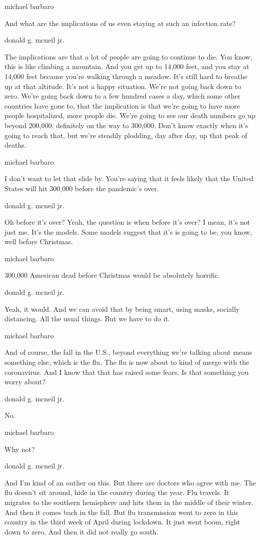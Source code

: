 michael barbaro

And what are the implications of us even staying at such an infection
rate?

donald g. mcneil jr.

The implications are that a lot of people are going to continue to die.
You know, this is like climbing a mountain. And you get up to 14,000
feet, and you stay at 14,000 feet because you're walking through a
meadow. It's still hard to breathe up at that altitude. It's not a happy
situation. We're not going back down to zero. We're going back down to a
few hundred cases a day, which some other countries have gone to, that
the implication is that we're going to have more people hospitalized,
more people die. We're going to see our death numbers go up beyond
200,000, definitely on the way to 300,000. Don't know exactly when it's
going to reach that, but we're steadily plodding, day after day, up that
peak of deaths.

michael barbaro

I don't want to let that slide by. You're saying that it feels likely
that the United States will hit 300,000 before the pandemic's over.

donald g. mcneil jr.

Oh before it's over? Yeah, the question is when before it's over? I
mean, it's not just me. It's the models. Some models suggest that it's
is going to be, you know, well before Christmas.

michael barbaro

300,000 American dead before Christmas would be absolutely horrific.

donald g. mcneil jr.

Yeah, it would. And we can avoid that by being smart, using masks,
socially distancing. All the usual things. But we have to do it.

michael barbaro

And of course, the fall in the U.S., beyond everything we're talking
about means something else, which is the flu. The flu is now about to
kind of merge with the coronavirus. And I know that that has raised some
fears. Is that something you worry about?

donald g. mcneil jr.

No.

michael barbaro

Why not?

donald g. mcneil jr.

And I'm kind of an outlier on this. But there are doctors who agree with
me. The flu doesn't sit around, hide in the country during the year. Flu
travels. It migrates to the southern hemisphere and hits them in the
middle of their winter. And then it comes back in the fall. But flu
transmission went to zero in this country in the third week of April
during lockdown. It just went boom, right down to zero. And then it did
not really go south.

